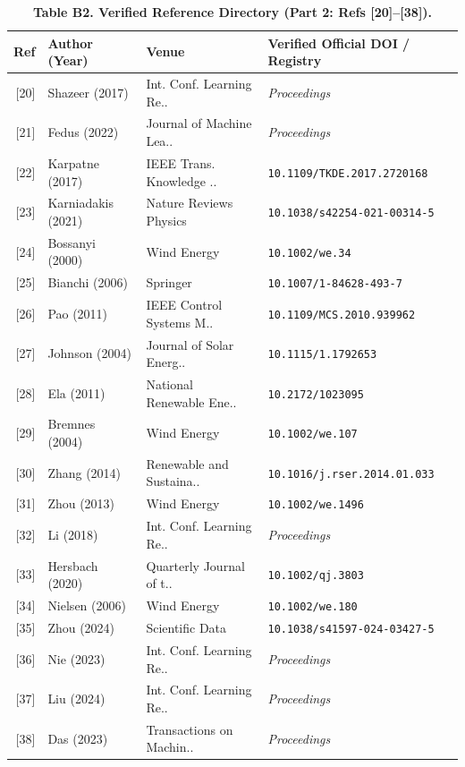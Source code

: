 \documentclass[
  journal]{IEEEtran}
\begin{document}
\begin{table}[!t]
\centering
\fontsize{8.0pt}{9.6pt}\selectfont
\setlength{\tabcolsep}{4pt}
\renewcommand{\arraystretch}{1.05}
\caption*{\textbf{Table B2. Verified Reference Directory (Part 2: Refs [20]--[38]).}}
%
\setlength{\tabcolsep}{4pt}
\begin{tabular}{rlll}
\toprule
\textbf{Ref} & \textbf{Author (Year)} & \textbf{Venue} & \textbf{Verified Official DOI / Registry} \\
\midrule
{[20]} & Shazeer (2017) & Int. Conf. Learning Re.. & \textit{Proceedings} \\
{[21]} & Fedus (2022) & Journal of Machine Lea.. & \textit{Proceedings} \\
{[22]} & Karpatne (2017) & IEEE Trans. Knowledge .. & \texttt{10.1109/TKDE.2017.2720168} \\
{[23]} & Karniadakis (2021) & Nature Reviews Physics & \texttt{10.1038/s42254-021-00314-5} \\
{[24]} & Bossanyi (2000) & Wind Energy & \texttt{10.1002/we.34} \\
{[25]} & Bianchi (2006) & Springer & \texttt{10.1007/1-84628-493-7} \\
{[26]} & Pao (2011) & IEEE Control Systems M.. & \texttt{10.1109/MCS.2010.939962} \\
{[27]} & Johnson (2004) & Journal of Solar Energ.. & \texttt{10.1115/1.1792653} \\
{[28]} & Ela (2011) & National Renewable Ene.. & \texttt{10.2172/1023095} \\
{[29]} & Bremnes (2004) & Wind Energy & \texttt{10.1002/we.107} \\
{[30]} & Zhang (2014) & Renewable and Sustaina.. & \texttt{10.1016/j.rser.2014.01.033} \\
{[31]} & Zhou (2013) & Wind Energy & \texttt{10.1002/we.1496} \\
{[32]} & Li (2018) & Int. Conf. Learning Re.. & \textit{Proceedings} \\
{[33]} & Hersbach (2020) & Quarterly Journal of t.. & \texttt{10.1002/qj.3803} \\
{[34]} & Nielsen (2006) & Wind Energy & \texttt{10.1002/we.180} \\
{[35]} & Zhou (2024) & Scientific Data & \texttt{10.1038/s41597-024-03427-5} \\
{[36]} & Nie (2023) & Int. Conf. Learning Re.. & \textit{Proceedings} \\
{[37]} & Liu (2024) & Int. Conf. Learning Re.. & \textit{Proceedings} \\
{[38]} & Das (2023) & Transactions on Machin.. & \textit{Proceedings} \\
\bottomrule
\end{tabular}
\end{table}
\end{document}
